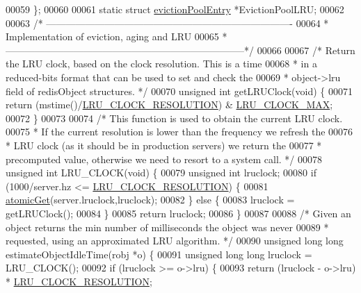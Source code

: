 \begin{DoxyCode}
00059 \};
00060 
00061 \textcolor{keyword}{static} \textcolor{keyword}{struct} \hyperlink{structevictionPoolEntry}{evictionPoolEntry} *EvictionPoolLRU;
00062 
00063 \textcolor{comment}{/* ----------------------------------------------------------------------------}
00064 \textcolor{comment}{ * Implementation of eviction, aging and LRU}
00065 \textcolor{comment}{ * --------------------------------------------------------------------------*/}
00066 
00067 \textcolor{comment}{/* Return the LRU clock, based on the clock resolution. This is a time}
00068 \textcolor{comment}{ * in a reduced-bits format that can be used to set and check the}
00069 \textcolor{comment}{ * object->lru field of redisObject structures. */}
00070 \textcolor{keywordtype}{unsigned} \textcolor{keywordtype}{int} getLRUClock(\textcolor{keywordtype}{void}) \{
00071     \textcolor{keywordflow}{return} (mstime()/\hyperlink{server_8h_ace9135e475fa92a1d52f0c5782687efe}{LRU\_CLOCK\_RESOLUTION}) & 
      \hyperlink{server_8h_a39e838b26cf6677ae57950f45a45f1b2}{LRU\_CLOCK\_MAX};
00072 \}
00073 
00074 \textcolor{comment}{/* This function is used to obtain the current LRU clock.}
00075 \textcolor{comment}{ * If the current resolution is lower than the frequency we refresh the}
00076 \textcolor{comment}{ * LRU clock (as it should be in production servers) we return the}
00077 \textcolor{comment}{ * precomputed value, otherwise we need to resort to a system call. */}
00078 \textcolor{keywordtype}{unsigned} \textcolor{keywordtype}{int} LRU\_CLOCK(\textcolor{keywordtype}{void}) \{
00079     \textcolor{keywordtype}{unsigned} \textcolor{keywordtype}{int} lruclock;
00080     \textcolor{keywordflow}{if} (1000/server.hz <= \hyperlink{server_8h_ace9135e475fa92a1d52f0c5782687efe}{LRU\_CLOCK\_RESOLUTION}) \{
00081         \hyperlink{atomicvar_8h_a57b17e058ecff6871debb3d1d4f3031a}{atomicGet}(server.lruclock,lruclock);
00082     \} \textcolor{keywordflow}{else} \{
00083         lruclock = getLRUClock();
00084     \}
00085     \textcolor{keywordflow}{return} lruclock;
00086 \}
00087 
00088 \textcolor{comment}{/* Given an object returns the min number of milliseconds the object was never}
00089 \textcolor{comment}{ * requested, using an approximated LRU algorithm. */}
00090 \textcolor{keywordtype}{unsigned} \textcolor{keywordtype}{long} \textcolor{keywordtype}{long} estimateObjectIdleTime(robj *o) \{
00091     \textcolor{keywordtype}{unsigned} \textcolor{keywordtype}{long} \textcolor{keywordtype}{long} lruclock = LRU\_CLOCK();
00092     \textcolor{keywordflow}{if} (lruclock >= o->lru) \{
00093         \textcolor{keywordflow}{return} (lruclock - o->lru) * \hyperlink{server_8h_ace9135e475fa92a1d52f0c5782687efe}{LRU\_CLOCK\_RESOLUTION};

\end{DoxyCode}
